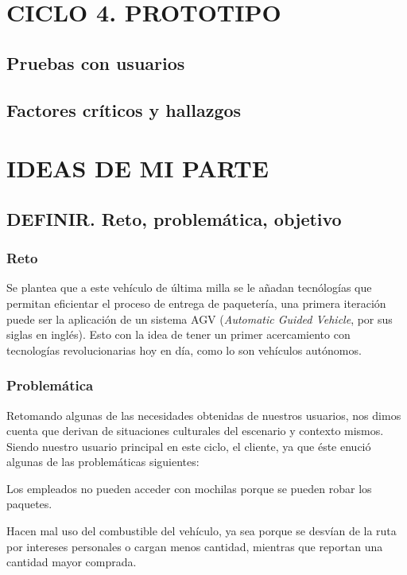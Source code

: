 \documentclass[12pt,letterpaper]{book}
\begin{document}
\newpage

\chapter{CICLO 4. PROTOTIPO}
\section{Pruebas con usuarios}
\section{Factores críticos y hallazgos}

\newpage

\chapter{IDEAS DE MI PARTE}
\section{DEFINIR. Reto, problemática, objetivo}
\subsection{Reto}

Se plantea que a este vehículo de última milla se le añadan tecnólogías que permitan eficientar el proceso de entrega de paquetería, una primera iteración puede ser la aplicación de un sistema AGV (\textit{Automatic Guided Vehicle}, por sus siglas en inglés). Esto con la idea de tener un primer acercamiento con tecnologías revolucionarias hoy en día, como lo son vehículos autónomos.

\subsection{Problemática}

Retomando algunas de las necesidades obtenidas de nuestros usuarios, nos dimos cuenta que derivan de situaciones culturales del escenario y contexto mismos. Siendo nuestro usuario principal en este ciclo, el cliente, ya que éste enució algunas de las problemáticas siguientes:


Los empleados no pueden acceder con mochilas porque se pueden robar los paquetes.

Hacen mal uso del combustible del vehículo, ya sea porque se desvían de la ruta por intereses personales o cargan menos cantidad, mientras que reportan una cantidad mayor comprada.
\end{document}
